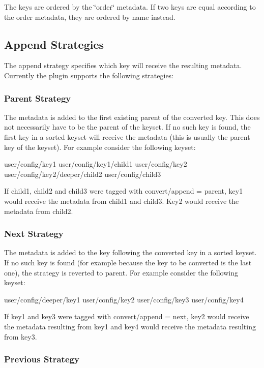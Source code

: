 The keys are ordered by the \char`\"{}order\char`\"{} metadata. If two keys are equal according to the order metadata, they are ordered by name instead.

\subsection*{Append Strategies}

The append strategy specifies which key will receive the resulting metadata. Currently the plugin supports the following strategies\+:

\subsubsection*{Parent Strategy}

The metadata is added to the first existing parent of the converted key. This does not necessarily have to be the parent of the keyset. If no such key is found, the first key in a sorted keyset will receive the metadata (this is usually the parent key of the keyset). For example consider the following keyset\+: \begin{DoxyVerb}user/config/key1
user/config/key1/child1
user/config/key2
user/config/key2/deeper/child2
user/config/child3
\end{DoxyVerb}


If child1, child2 and child3 were tagged with {\ttfamily convert/append = parent}, key1 would receive the metadata from child1 and child3. Key2 would receive the metadata from child2.

\subsubsection*{Next Strategy}

The metadata is added to the key following the converted key in a sorted keyset. If no such key is found (for example because the key to be converted is the last one), the strategy is reverted to parent. For example consider the following keyset\+: \begin{DoxyVerb}user/config/deeper/key1
user/config/key2
user/config/key3
user/config/key4
\end{DoxyVerb}


If key1 and key3 were tagged with {\ttfamily convert/append = next}, key2 would receive the metadata resulting from key1 and key4 would receive the metadata resulting from key3.

\subsubsection*{Previous Strategy}

